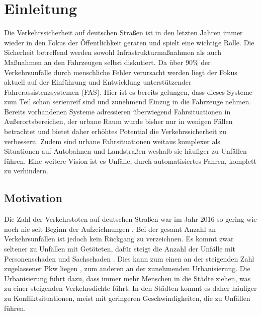 
\chapter{Einleitung}\label{chapter:Motivation}

Die Verkehrssicherheit auf deutschen Straßen ist in den letzten Jahren immer wieder in den Fokus der Öffentlichkeit geraten und spielt eine wichtige Rolle. Die Sicherheit betreffend werden sowohl Infrastrukturmaßnahmen als auch Maßnahmen an den Fahrzeugen selbst diskutiert. Da über 90\% \parencite[S.48]{DEKRA.2017} der Verkehrsunfälle durch menschliche Fehler verursacht werden liegt der Fokus aktuell auf der Einführung und Entwicklung unterstützender Fahrerassistenzsystemen (FAS). Hier ist es bereits gelungen, dass dieses Systeme zum Teil schon serienreif sind und zunehmend Einzug in die Fahrzeuge nehmen. Bereits vorhandenen Systeme adressieren überwiegend Fahrsituationen in Außerortsbereichen, der urbane Raum wurde bisher nur in wenigen Fällen betrachtet und bietet daher erhöhtes Potential die Verkehrssicherheit zu verbessern. Zudem sind urbane Fahrsituationen weitaus komplexer als Situationen auf Autobahnen und Landstraßen weshalb sie häufiger zu Unfällen führen. Eine weitere Vision ist es Unfälle, durch automatisiertes Fahren, komplett zu verhindern. 

\section{Motivation}

Die Zahl der Verkehrstoten auf deutschen Straßen war im Jahr 2016 so gering wie noch nie seit Beginn der Aufzeichnungen \parencite[S.5]{StatistischesBundesamt.2018}. Bei der gesamt Anzahl an Verkehrsunfällen ist jedoch kein Rückgang zu verzeichnen. Es kommt zwar seltener zu Unfällen mit Getöteten, dafür steigt die Anzahl der Unfälle mit Personenschaden und Sachschaden \parencite[S.5]{StatistischesBundesamt.2018}. Dies kann zum einen an der steigenden Zahl zugelassener Pkw liegen \parencite[S.5]{StatistischesBundesamt.2018}, zum anderen an der zunehmenden Urbanisierung. Die Urbanisierung führt dazu, dass immer mehr Menschen in die Städte ziehen, was zu einer steigenden Verkehrsdichte führt. In den Städten kommt es daher häufiger zu Konfliktsituationen, meist mit geringeren Geschwindigkeiten, die zu Unfällen führen.

